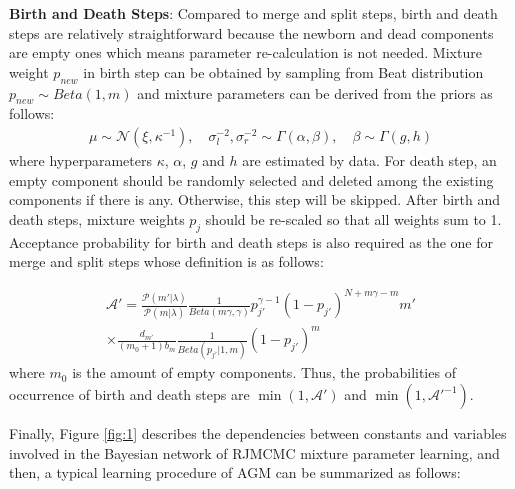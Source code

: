 \documentclass[conference]{IEEEtran}
\begin{document}
\textbf{Birth and Death Steps}: Compared to merge and split steps, birth and death steps are relatively straightforward because the newborn and dead components are empty ones which means parameter re-calculation is not needed. Mixture weight $p_{new}$ in birth step can be obtained by sampling from Beat distribution $p_{new} \sim Beta(1,m)$ and mixture parameters can be derived from the priors as follows\cite{Casella2004}:
\begin{align}
\mu \sim \mathcal{N}(\xi,\kappa^{-1}), \quad \sigma_{l}^{-2},\sigma_{r}^{-2} \sim \Gamma(\alpha,\beta), \quad \beta \sim \Gamma(g,h)
\label{eq:prior}
\end{align}
where hyperparameters $\kappa$, $\alpha$, $g$ and $h$ are estimated by data. For death step, an empty component should be randomly selected and deleted among the existing components if there is any. Otherwise, this step will be skipped. After birth and death steps, mixture weights $p_j$ should be re-scaled so that all weights sum to 1. Acceptance probability for birth and death steps is also required as the one for merge and split steps whose definition is as follows:

\begin{multline}
\mathcal{A}'=\frac{\mathcal{P}(m'|\lambda)}{\mathcal{P}(m|\lambda)}\frac{1}{Beta(m\gamma,\gamma)}p_{j'}^{\gamma-1}(1-p_{j'})^{N+m\gamma-m}m' \\
\times \frac{d_{m'}}{(m_0+1)b_m}\frac{1}{Beta(p_{j'}|1,m)}(1-p_{j'})^m\qquad\quad
\label{eq:acptProBD}
\end{multline}
where $m_0$ is the amount of empty components. Thus, the probabilities of occurrence of birth and death steps are $\min(1,\mathcal{A}')$ and $\min(1,\mathcal{A}'^{-1})$\cite{Richardson1997}.

Finally, Figure \ref{fig:1} describes the dependencies between constants and variables involved in the Bayesian network of RJMCMC mixture parameter learning, and then, a typical learning procedure of AGM can be summarized as follows:
\bigskip


\end{document}
